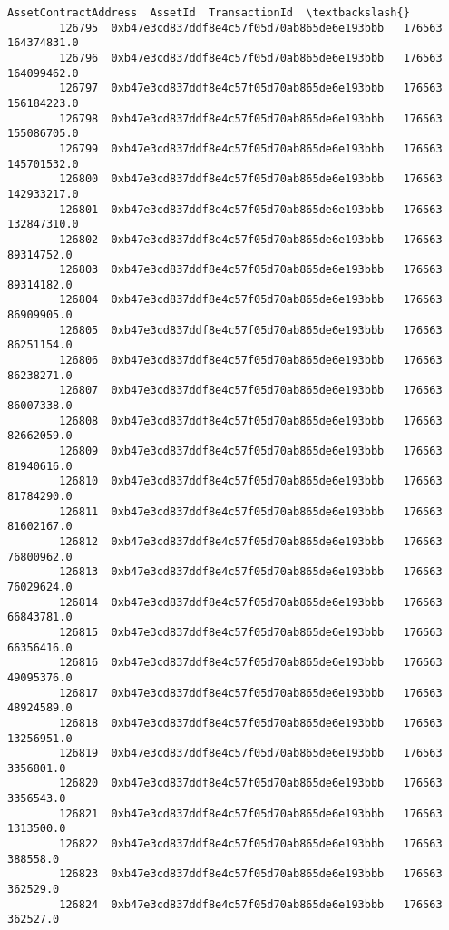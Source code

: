 \documentclass[11pt]{article}
\begin{document}
\begin{Verbatim}[commandchars=\\\{\}]
                                      AssetContractAddress  AssetId  TransactionId  \textbackslash{}
        126795  0xb47e3cd837ddf8e4c57f05d70ab865de6e193bbb   176563    164374831.0   
        126796  0xb47e3cd837ddf8e4c57f05d70ab865de6e193bbb   176563    164099462.0   
        126797  0xb47e3cd837ddf8e4c57f05d70ab865de6e193bbb   176563    156184223.0   
        126798  0xb47e3cd837ddf8e4c57f05d70ab865de6e193bbb   176563    155086705.0   
        126799  0xb47e3cd837ddf8e4c57f05d70ab865de6e193bbb   176563    145701532.0   
        126800  0xb47e3cd837ddf8e4c57f05d70ab865de6e193bbb   176563    142933217.0   
        126801  0xb47e3cd837ddf8e4c57f05d70ab865de6e193bbb   176563    132847310.0   
        126802  0xb47e3cd837ddf8e4c57f05d70ab865de6e193bbb   176563     89314752.0   
        126803  0xb47e3cd837ddf8e4c57f05d70ab865de6e193bbb   176563     89314182.0   
        126804  0xb47e3cd837ddf8e4c57f05d70ab865de6e193bbb   176563     86909905.0   
        126805  0xb47e3cd837ddf8e4c57f05d70ab865de6e193bbb   176563     86251154.0   
        126806  0xb47e3cd837ddf8e4c57f05d70ab865de6e193bbb   176563     86238271.0   
        126807  0xb47e3cd837ddf8e4c57f05d70ab865de6e193bbb   176563     86007338.0   
        126808  0xb47e3cd837ddf8e4c57f05d70ab865de6e193bbb   176563     82662059.0   
        126809  0xb47e3cd837ddf8e4c57f05d70ab865de6e193bbb   176563     81940616.0   
        126810  0xb47e3cd837ddf8e4c57f05d70ab865de6e193bbb   176563     81784290.0   
        126811  0xb47e3cd837ddf8e4c57f05d70ab865de6e193bbb   176563     81602167.0   
        126812  0xb47e3cd837ddf8e4c57f05d70ab865de6e193bbb   176563     76800962.0   
        126813  0xb47e3cd837ddf8e4c57f05d70ab865de6e193bbb   176563     76029624.0   
        126814  0xb47e3cd837ddf8e4c57f05d70ab865de6e193bbb   176563     66843781.0   
        126815  0xb47e3cd837ddf8e4c57f05d70ab865de6e193bbb   176563     66356416.0   
        126816  0xb47e3cd837ddf8e4c57f05d70ab865de6e193bbb   176563     49095376.0   
        126817  0xb47e3cd837ddf8e4c57f05d70ab865de6e193bbb   176563     48924589.0   
        126818  0xb47e3cd837ddf8e4c57f05d70ab865de6e193bbb   176563     13256951.0   
        126819  0xb47e3cd837ddf8e4c57f05d70ab865de6e193bbb   176563      3356801.0   
        126820  0xb47e3cd837ddf8e4c57f05d70ab865de6e193bbb   176563      3356543.0   
        126821  0xb47e3cd837ddf8e4c57f05d70ab865de6e193bbb   176563      1313500.0   
        126822  0xb47e3cd837ddf8e4c57f05d70ab865de6e193bbb   176563       388558.0   
        126823  0xb47e3cd837ddf8e4c57f05d70ab865de6e193bbb   176563       362529.0   
        126824  0xb47e3cd837ddf8e4c57f05d70ab865de6e193bbb   176563       362527.0   

\end{Verbatim}
\end{document}
